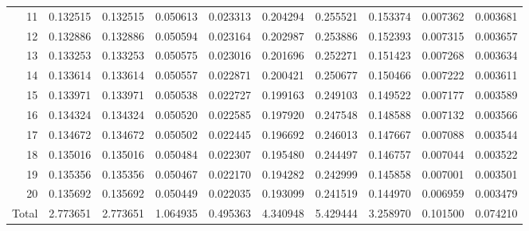 \documentclass[lettersize,journal]{IEEEtran}
\begin{document}
\begin{table}[ht!]
\begin{center}
\begin{tabular}{r|l|l|l|l|l|l|l|l|l}
      11 & 0.132515 & 0.132515 & 0.050613 & 0.023313 & 0.204294 & 0.255521 & 0.153374 & 0.007362 & 0.003681 \\
      12 & 0.132886 & 0.132886 & 0.050594 & 0.023164 & 0.202987 & 0.253886 & 0.152393 & 0.007315 & 0.003657 \\
      13 & 0.133253 & 0.133253 & 0.050575 & 0.023016 & 0.201696 & 0.252271 & 0.151423 & 0.007268 & 0.003634 \\
      14 & 0.133614 & 0.133614 & 0.050557 & 0.022871 & 0.200421 & 0.250677 & 0.150466 & 0.007222 & 0.003611 \\
      15 & 0.133971 & 0.133971 & 0.050538 & 0.022727 & 0.199163 & 0.249103 & 0.149522 & 0.007177 & 0.003589 \\
      16 & 0.134324 & 0.134324 & 0.050520 & 0.022585 & 0.197920 & 0.247548 & 0.148588 & 0.007132 & 0.003566 \\
      17 & 0.134672 & 0.134672 & 0.050502 & 0.022445 & 0.196692 & 0.246013 & 0.147667 & 0.007088 & 0.003544 \\
      18 & 0.135016 & 0.135016 & 0.050484 & 0.022307 & 0.195480 & 0.244497 & 0.146757 & 0.007044 & 0.003522 \\
      19 & 0.135356 & 0.135356 & 0.050467 & 0.022170 & 0.194282 & 0.242999 & 0.145858 & 0.007001 & 0.003501 \\
      20 & 0.135692 & 0.135692 & 0.050449 & 0.022035 & 0.193099 & 0.241519 & 0.144970 & 0.006959 & 0.003479 \\
      Total & 2.773651 & 2.773651 & 1.064935 & 0.495363 & 4.340948 & 5.429444 & 3.258970 & 0.101500 & 0.074210 \\
    \end{tabular}
  \end{center}
\end{table}
\end{document}

